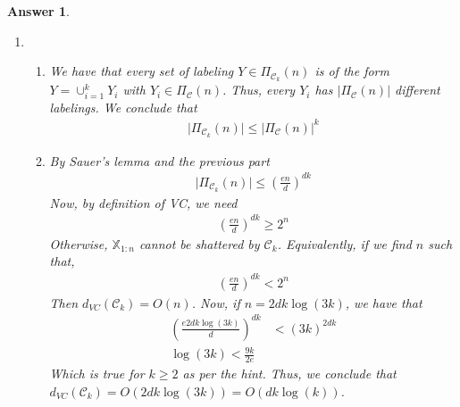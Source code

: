 \documentclass[12pt]{article}
\theoremstyle{colon}
\newtheorem*{answer}{Answer}
\begin{document}
\begin{answer}
\begin{enumerate}[label=\arabic*)]
    \item
      \leavevmode
      \begin{enumerate}[label=\alph*)]
        \item We have that every set of labeling $Y \in \Pi_{\mathcal{C}_k} (n)$ is of the form $Y = \cup_{i=1}^k Y_i$ with $Y_i \in \Pi_{\mathcal{C}}(n)$. Thus, every $Y_i$ has $\lvert \Pi_{\mathcal{C}}(n) \rvert$ different labelings. We conclude that
          \begin{gather*}
            \lvert \Pi_{\mathcal{C}_k} (n) \rvert \leq \lvert \Pi_{\mathcal{C}} (n) \rvert^k
          \end{gather*}

        \item By Sauer's lemma and the previous part
          \begin{gather*}
            \lvert \Pi_{\mathcal{C}_k} (n) \rvert \leq \left( \frac{en}{d} \right)^{dk}
          \end{gather*}
          Now, by definition of VC, we need
          \begin{gather*}
            \left( \frac{en}{d} \right)^{dk} \geq 2^n
          \end{gather*}
          Otherwise, $\mathbb{X}_{1:n}$ cannot be shattered by $\mathcal{C}_k$. Equivalently, if we find $n$ such that,
          \begin{gather*}
            \left( \frac{en}{d} \right)^{dk} < 2^n
          \end{gather*}
          Then $d_{VC}(\mathcal{C}_k) = O(n)$. Now, if $n = 2dk \log(3k)$, we have that
          \begin{align*}
            \left( \frac{e 2 d k \log(3k)}{d} \right)^{dk} &< (3k)^{2dk} \\
            \log(3k) < \frac{9k}{2e}
          \end{align*}
          Which is true for $k \geq 2$ as per the hint. Thus, we conclude that $d_{VC}(\mathcal{C}_k) = O(2dk \log(3k)) = O(dk \log(k))$.
      \end{enumerate}
  \end{enumerate}
\end{answer}

\clearpage
\end{document}
